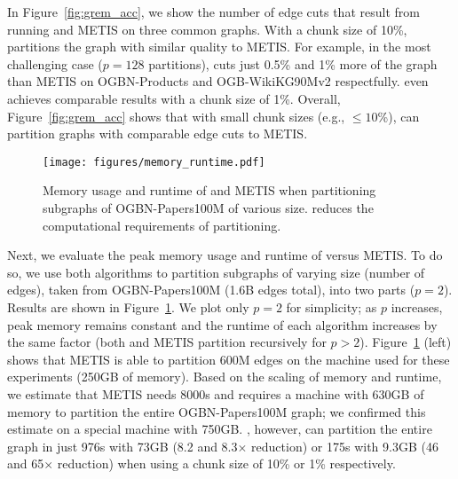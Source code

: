 In Figure~\ref{fig:grem_acc}, we show the number of edge cuts that result from running \partitioning and METIS on three common graphs. With a chunk size of 10\%, \partitioning partitions the graph with similar quality to METIS. For example, in the most challenging case ($p=128$ partitions), \partitioning cuts just 0.5\% and 1\% more of the graph than METIS on OGBN-Products and OGB-WikiKG90Mv2 respectfully. \partitioning even achieves comparable results with a chunk size of 1\%. Overall, Figure~\ref{fig:grem_acc} shows that with small chunk sizes (e.g., $\le 10$\%), \partitioning can partition graphs with comparable edge cuts to METIS.



\begin{figure}[t]
  \centering
  \texttt{[image: figures/memory\_runtime.pdf]}
  \vspace{-0.3in}
  \caption{Memory usage and runtime of \partitioning and METIS when partitioning subgraphs of OGBN-Papers100M of various size. \partitioning reduces the computational requirements of partitioning.}
  \label{fig:grem_memory_runtime}
  \vspace{-0.15in}
\end{figure}

Next, we evaluate the peak memory usage and runtime of \partitioning versus METIS. To do so, we use both algorithms to partition subgraphs of varying size (number of edges), taken from OGBN-Papers100M (1.6B edges total), into two parts ($p=2$). Results are shown in Figure~\ref{fig:grem_memory_runtime}. We plot only $p=2$ for simplicity; as $p$ increases, peak memory remains constant and the runtime of each algorithm increases by the same factor (both \partitioning and METIS partition recursively for $p>2$). Figure~\ref{fig:grem_memory_runtime} (left) shows that METIS is able to partition 600M edges on the machine used for these experiments (250GB of memory). Based on the scaling of memory and runtime, we estimate that METIS needs 8000s and requires a machine with 630GB of memory to partition the entire OGBN-Papers100M graph; we confirmed this estimate on a special machine with 750GB. \partitioning, however, can partition the entire graph in just 976s with 73GB (8.2 and 8.3$\times$ reduction) or 175s with 9.3GB (46 and 65$\times$ reduction) when using a chunk size of 10\% or 1\% respectively.



